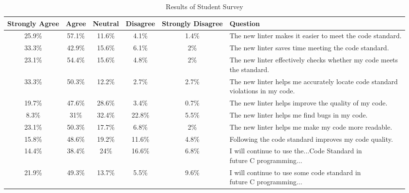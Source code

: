 \documentclass[sigconf]{acmart}
\begin{document}
\begin{table*}[t]
  \centering
  \begin{tabular}{cccccl}
    Strongly Agree & Agree  & Neutral & Disagree & Strongly Disagree & Question                                                          \\
    \hline
    25.9\%         & 57.1\% & 11.6\%  & 4.1\%    & 1.4\%             & The new linter makes it easier to meet the code standard.         \\
    \hline
    33.3\%         & 42.9\% & 15.6\%  & 6.1\%    & 2\%               & The new linter saves time meeting the code standard.              \\
    \hline
    23.1\%         & 54.4\% & 15.6\%  & 4.8\%    & 2\%               & \makecell{The new linter effectively checks whether my code meets \\ the standard.} \\
    \hline
    33.3\%         & 50.3\% & 12.2\%  & 2.7\%    & 2.7\%             & \makecell{The new linter helps me accurately locate code standard \\ violations in my code.} \\
    \hline
    19.7\%         & 47.6\% & 28.6\%  & 3.4\%    & 0.7\%             & The new linter helps improve the quality of my code. \\
    \hline
    8.3\%          & 31\%   & 32.4\%  & 22.8\%   & 5.5\%             & The new linter helps me find bugs in my code. \\
    \hline
    23.1\%         & 50.3\% & 17.7\%  & 6.8\%    & 2\%               & The new linter helps me make my code more readable. \\
    \hline
    15.8\%         & 48.6\% & 19.2\%  & 11.6\%   & 4.8\%             & Following the code standard improves my code quality. \\
    \hline
    14.4\%         & 38.4\% & 24\%    & 16.6\%   & 6.8\%             & \makecell{I will continue to use the...Code Standard in \\ future C programming...} \\
    \hline
    21.9\%         & 49.3\% & 13.7\%  & 5.5\%    & 9.6\%             & \makecell{I will continue to use some code standard in \\ future C programming...} \\
    \hline
  \end{tabular}
  \caption{Results of Student Survey}
  \label{tab:surveyresults}
\end{table*}
\end{document}
